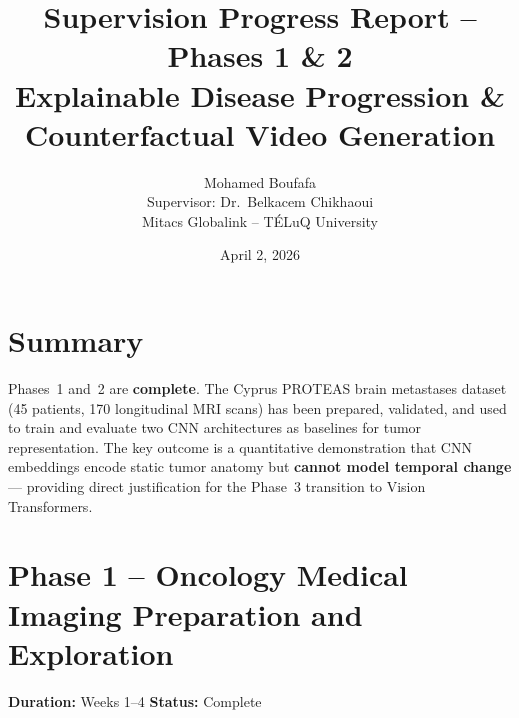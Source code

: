 \documentclass[10pt,a4paper]{article}
\title{\vspace{-1.5cm}\textbf{Supervision Progress Report -- Phases 1 \& 2}\\[4pt]
\large Explainable Disease Progression \& Counterfactual Video Generation}
\author{Mohamed Boufafa \\ Supervisor: Dr.~Belkacem Chikhaoui \\ Mitacs Globalink -- T\'ELuQ University}
\date{April 2, 2026}
\begin{document}
\maketitle
\vspace{-0.5cm}

\section{Summary}

Phases~1 and~2 are \textbf{complete}. The Cyprus PROTEAS brain metastases dataset (45 patients, 170 longitudinal MRI scans) has been prepared, validated, and used to train and evaluate two CNN architectures as baselines for tumor representation. The key outcome is a quantitative demonstration that CNN embeddings encode static tumor anatomy but \textbf{cannot model temporal change} --- providing direct justification for the Phase~3 transition to Vision Transformers.

\section{Phase 1 -- Oncology Medical Imaging Preparation and Exploration}

\textbf{Duration:} Weeks 1--4 \hfill \textbf{Status:} Complete
\end{document}
